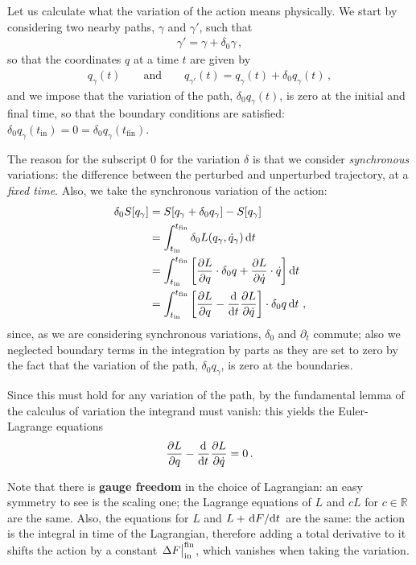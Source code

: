 \documentclass[main.tex]{subfiles}
\begin{document}
Let us calculate what the variation of the action means physically. We start by considering two nearby paths, \(\gamma \) and \(\gamma '\), such that 
%
\begin{align}
\gamma ' = \gamma + \delta_0 \gamma 
\,,
\end{align}
%
so that the coordinates \(q\) at a time \(t\) are given by 
%
\begin{align}
q_{\gamma } (t) 
\qquad \text{and} \qquad
q_{\gamma '} (t) = q_{\gamma }(t) + \delta_0 q_{\gamma }(t)
\,,
\end{align}
%
and we impose that the variation of the path, \(\delta_0 q_{\gamma } (t)\), is zero at the initial and final time, so that the boundary conditions are satisfied: \(\delta_0 q_{\gamma }(t _{\text{in}}) = 0 = \delta_0 q_{\gamma }(t _{\text{fin}})\).

The reason for the subscript \(0\) for the variation \(\delta \) is that we consider \emph{synchronous} variations: the difference between the perturbed and unperturbed trajectory, at a \emph{fixed time}. 
Also, we take the synchronous variation of the action:
%
\begin{subequations}
\begin{align}
\delta_0 S [q_{\gamma }] &= S [q_{\gamma } + \delta_0 q_{\gamma }] - S[q_{\gamma }]  \\
&= \int_{t _{\text{in}}}^{t _{\text{fin}}} \delta_0 L (q_{\gamma }, \dot{q}_{\gamma }) \dd{t}  \\
&= \int_{t _{\text{in}}}^{t _{\text{fin}}} \qty[ \pdv{L}{q} \cdot \delta_0 q + \pdv{L}{\dot{q}} \cdot \dot{q}] \dd{t}  \\
&= \int_{t _{\text{in}}}^{t _{\text{fin}}} \qty[\pdv{L}{q}  - \dv{}{t} \pdv{L}{\dot{q}}] \cdot \delta_0 q \dd{t}
\,,
\end{align}
\end{subequations}
%
since, as we are considering synchronous variations, \(\delta_0 \) and \(\partial_{t}\) commute; also we neglected boundary terms in the integration by parts as they are set to zero by the fact that the variation of the path,  \(\delta_0 q_{\gamma }\), is zero at the boundaries.

Since this must hold for any variation of the path, by the fundamental lemma of the calculus of variation the integrand must vanish: this yields the Euler-Lagrange equations 
%
\begin{align}
\pdv{L}{q} - \dv[]{}{t} \pdv{L}{\dot{q}} = 0
\,.
\end{align}

Note that there is \textbf{gauge freedom} in the choice of Lagrangian: an easy symmetry to see is the scaling one; the Lagrange equations of \(L\) and \(cL\) for \(c \in \mathbb{R}\) are the same. 
Also, the equations for \(L\) and \(L + \dv*{F}{t}\) are the same: the action is the integral in time of the Lagrangian, therefore adding a total derivative to it shifts the action by a constant \(\eval{\Delta F}_{\text{in}}^{\text{fin}}\), which vanishes when taking the variation.
\end{document}
